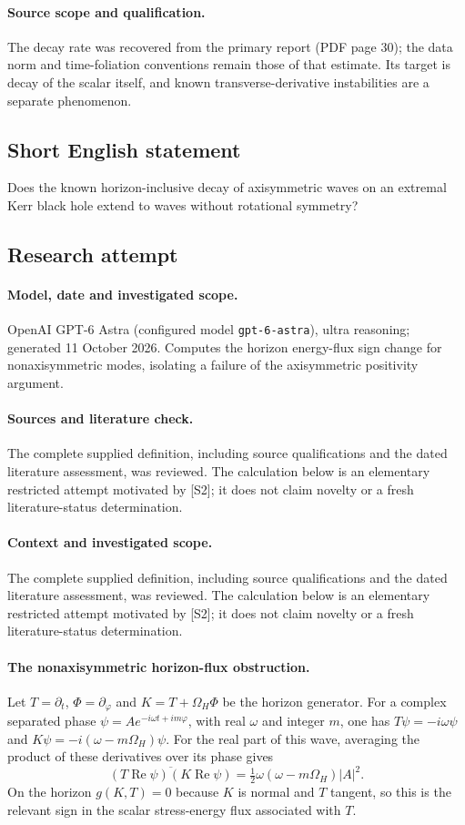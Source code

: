 \documentclass[11pt]{article}
\begin{document}
\paragraph{Source scope and qualification.}
The decay rate was recovered from the primary report (PDF page 30); the data norm and time-foliation conventions remain those of that estimate. Its target is decay of the scalar itself, and known transverse-derivative instabilities are a separate phenomenon.
\subsection{Short English statement}
Does the known horizon-inclusive decay of axisymmetric waves on an extremal Kerr black hole extend to waves without rotational symmetry?
\subsection{Research attempt}
\paragraph{Model, date and investigated scope.}
OpenAI GPT-6 Astra (configured model \texttt{gpt-6-astra}), ultra reasoning; generated 11 October 2026. Computes the horizon energy-flux sign change for nonaxisymmetric modes, isolating a failure of the axisymmetric positivity argument.

\paragraph{Sources and literature check.}
The complete supplied definition, including source qualifications and the dated literature assessment, was reviewed. The calculation below is an elementary restricted attempt motivated by [S2]; it does not claim novelty or a fresh literature-status determination.

\paragraph{Context and investigated scope.} The complete supplied definition, including source qualifications and the dated literature assessment, was reviewed. The calculation below is an elementary restricted attempt motivated by [S2]; it does not claim novelty or a fresh literature-status determination.

\paragraph{The nonaxisymmetric horizon-flux obstruction.} Let $T=\partial_t$, $\Phi=\partial_\varphi$ and $K=T+\Omega_H\Phi$ be the horizon generator. For a complex separated phase $\psi=Ae^{-i\omega t+im\varphi}$, with real $\omega$ and integer $m$, one has $T\psi=-i\omega\psi$ and $K\psi=-i(\omega-m\Omega_H)\psi$. For the real part of this wave, averaging the product of these derivatives over its phase gives
\[
 \overline{(T\operatorname{Re}\psi)(K\operatorname{Re}\psi)}
 =\tfrac12\omega(\omega-m\Omega_H)|A|^2.
\]
On the horizon $g(K,T)=0$ because $K$ is normal and $T$ tangent, so this is the relevant sign in the scalar stress-energy flux associated with $T$.
\end{document}
